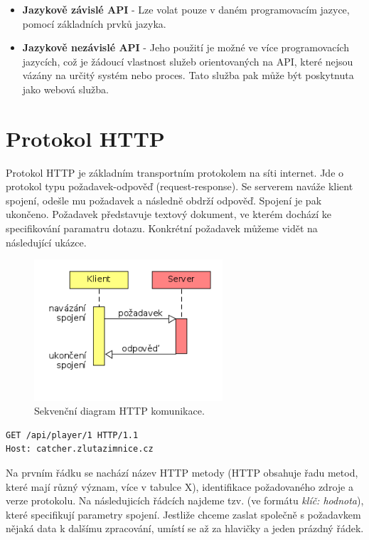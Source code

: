 \begin{itemize}
  \item \textbf{Jazykově závislé API} - Lze volat pouze v daném programovacím jazyce, pomocí základních prvků jazyka.
  \item \textbf{Jazykově nezávislé API} - Jeho použití je možné ve více programovacích jazycích, což je žádoucí vlastnost
    služeb orientovaných na API, které nejsou vázány na určitý systém nebo proces.
    Tato služba pak může být poskytnuta jako webová služba.
\end{itemize}

\section{Protokol HTTP}

\indent


Protokol HTTP je základním transportním protokolem na síti internet.
Jde o protokol typu požadavek-odpověď (request-response). Se serverem naváže klient spojení,
odešle mu požadavek a následně obdrží odpověď. Spojení je pak ukončeno.
Požadavek představuje textový dokument, ve kterém dochází ke specifikování paramatru dotazu.
Konkrétní požadavek můžeme vidět na následující ukázce.

\begin{figure}[ht!]
\centering
\includegraphics[width=70mm]{./images/http-komunikace.png}
\caption{Sekvenční diagram HTTP komunikace.\label{overflow}}
\end{figure}

\begingroup
\fontsize{9.5pt}{11pt}\selectfont
\begin{verbatim}
GET /api/player/1 HTTP/1.1
Host: catcher.zlutazimnice.cz
\end{verbatim}
\endgroup

Na prvním řádku se nachází název HTTP metody (HTTP obsahuje řadu metod, které mají různý význam, více v tabulce X),
identifikace požadovaného zdroje a verze protokolu. Na následujicích řádcích najdeme tzv. 
(ve formátu \textit{klíč: hodnota}), které specifikují parametry spojení. Jestliže chceme zaslat společně s požadavkem
nějaká data k dalšímu zpracování, umístí se až za hlavičky a jeden prázdný řádek.

